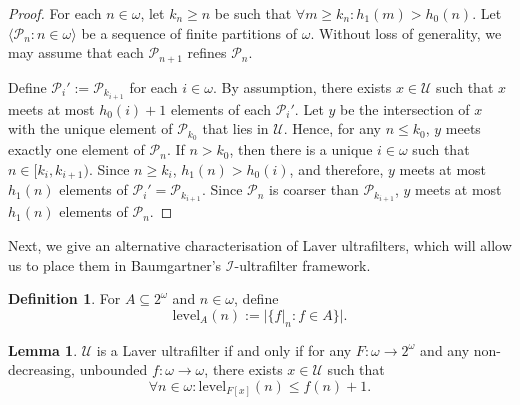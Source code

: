 \documentclass[12pt]{article}
\theoremstyle{definition}
\newtheorem{lem}[nummer]{\sc Lemma}
\newtheorem{defi}[nummer]{\sc Definition}
\newcommand\level{\text{level}}
\begin{document}
\begin{proof}
For each $n \in \omega$, let $k_n \geq n$ be such that $\forall m \geq k_n: h_1(m) > h_0(n)$. Let $\langle \mathcal{P}_n: n \in \omega\rangle$ be a sequence of finite partitions of $\omega$. Without loss of generality, we may assume that each $\mathcal{P}_{n+1}$ refines $\mathcal{P}_n$.

Define ${\mathcal{P}_i}':=\mathcal{P}_{k_{i+1}}$ for each $i \in \omega$. By assumption, there exists $x \in \mathcal{U}$ such that $x$ meets at most $h_0(i)+1$ elements of each $\mathcal{P}_i'$. Let $y$ be the intersection of $x$ with the unique element of $\mathcal{P}_{k_0}$ that lies in $\mathcal{U}$. Hence, for any $n \leq k_0$, $y$ meets exactly one element of $\mathcal{P}_n$. If $n > k_0$, then there is a unique $i \in \omega$ such that $n \in [k_i, k_{i+1})$. Since $n \geq k_i$, $h_1(n)> h_0(i)$, and therefore, $y$ meets at most $h_1(n)$ elements of $\mathcal{P}_{i}'=\mathcal{P}_{k_{i+1}}$. Since $\mathcal{P}_n$ is coarser than $\mathcal{P}_{k_{i+1}}$, $y$ meets at most $h_1(n)$ elements of $\mathcal{P}_n$.
\end{proof}

Next, we give an alternative characterisation of Laver ultrafilters, which will allow us to place them in Baumgartner's $\mathcal{I}$-ultrafilter framework.

\begin{defi}
For $A \subseteq 2^\omega$ and $n\in \omega$, define
\[\level_A(n):=|\{f|_n: f \in A\}|.\]	
\end{defi}

\begin{lem}\label{lem:Ff}
$\mathcal{U}$ is a Laver ultrafilter if and only if for any $F:\omega \to 2^\omega$ and any non-decreasing, unbounded $f: \omega \to \omega$, there exists $x \in \mathcal{U}$ such that 
\[\forall n \in \omega: \level_{F[x]}(n)\leq f(n)+1.\]
\end{lem}
\end{document}

